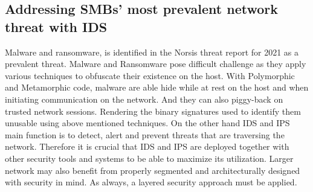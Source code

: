 \subsection{Addressing SMBs' most prevalent network threat with IDS}

Malware and ransomware, is identified in the Norsis \cite{Norsis2021} threat report for 2021 as a prevalent threat. Malware and Ransomware pose difficult challenge as they apply various techniques to obfuscate their existence on the host. With Polymorphic and Metamorphic code, malware are able hide while at rest on the host and when initiating communication on the network. And they can also piggy-back on trusted network sessions. Rendering the binary signatures used to identify them unusable using above mentioned techniques. On the other hand IDS and IPS main function is to detect, alert and prevent threats that are traversing the network. Therefore it is crucial that IDS and IPS are deployed together with other security tools and systems to be able to maximize its utilization. Larger network may also benefit from properly segmented and architecturally designed with security in mind. As always, a layered security approach must be applied.\\

\newpage
